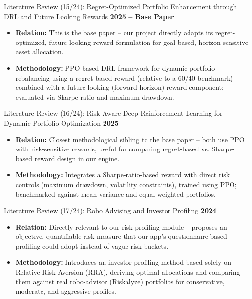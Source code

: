 \documentclass{beamer}
\begin{document}
\begin{frame}{Literature Review (15/24): Regret-Optimized Portfolio Enhancement through DRL and Future Looking Rewards}
\small
\textbf{2025 -- Base Paper}
\begin{itemize}
    \item \textbf{Relation:} This is the base paper -- our project directly adapts its regret-optimized, future-looking reward formulation for goal-based, horizon-sensitive asset allocation.
    \item \textbf{Methodology:} PPO-based DRL framework for dynamic portfolio rebalancing using a regret-based reward (relative to a 60/40 benchmark) combined with a future-looking (forward-horizon) reward component; evaluated via Sharpe ratio and maximum drawdown.
\end{itemize}
\end{frame}

\begin{frame}{Literature Review (16/24): Risk-Aware Deep Reinforcement Learning for Dynamic Portfolio Optimization}
\small
\textbf{2025}
\begin{itemize}
    \item \textbf{Relation:} Closest methodological sibling to the base paper -- both use PPO with risk-sensitive rewards, useful for comparing regret-based vs. Sharpe-based reward design in our engine.
    \item \textbf{Methodology:} Integrates a Sharpe-ratio-based reward with direct risk controls (maximum drawdown, volatility constraints), trained using PPO; benchmarked against mean-variance and equal-weighted portfolios.
\end{itemize}
\end{frame}

\begin{frame}{Literature Review (17/24): Robo Advising and Investor Profiling}
\small
\textbf{2024}
\begin{itemize}
    \item \textbf{Relation:} Directly relevant to our risk-profiling module -- proposes an objective, quantifiable risk measure that our app's questionnaire-based profiling could adopt instead of vague risk buckets.
    \item \textbf{Methodology:} Introduces an investor profiling method based solely on Relative Risk Aversion (RRA), deriving optimal allocations and comparing them against real robo-advisor (Riskalyze) portfolios for conservative, moderate, and aggressive profiles.
\end{itemize}
\end{frame}
\end{document}
